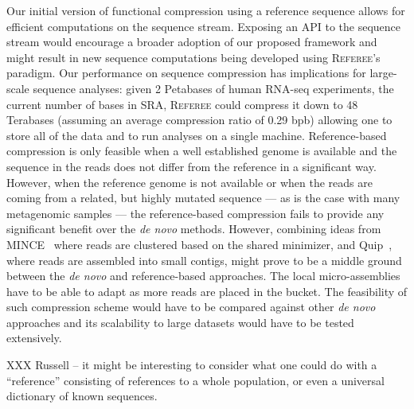 \documentclass[12pt]{cmuthesis}
\newcommand{\refer}{\textsc{Referee}\xspace}
\begin{document}
Our initial version of functional compression using a reference sequence allows for efficient computations on the sequence stream. Exposing an API to the sequence stream would encourage a broader adoption of our proposed  framework and might result in new sequence computations being developed using \refer's paradigm. Our performance on sequence compression has implications for large-scale sequence analyses: given 2 Petabases of human RNA-seq experiments, the current number of bases in SRA, \refer could compress it down to 48 Terabases (assuming an average compression ratio of 0.29 bpb) allowing one to store all of the data and to run analyses on a single machine.
Reference-based compression is only feasible when a well established genome is available and the sequence in the reads does not differ from the reference in a significant way. However, when the reference genome is not available or when the reads are coming from a related, but highly mutated sequence --- as is the case with many metagenomic samples --- the reference-based compression fails to provide any significant benefit over the \textit{de novo} methods. However, combining ideas from MINCE~\cite{Mince} where reads are clustered based on the shared minimizer, and Quip~\cite{Jones2012}, where reads are assembled into small contigs, might prove to be a middle ground between the \textit{de novo} and reference-based approaches. The local micro-assemblies have to be able to adapt as more reads are placed in the bucket. The feasibility of such compression scheme would have to be compared against other \textit{de novo} approaches and its scalability to large datasets would have to be tested extensively.

XXX Russell -- it might be interesting to consider what one could do with a ``reference'' consisting of references to a whole population, or even a universal dictionary of known sequences.

% 

\backmatter

\end{document}
